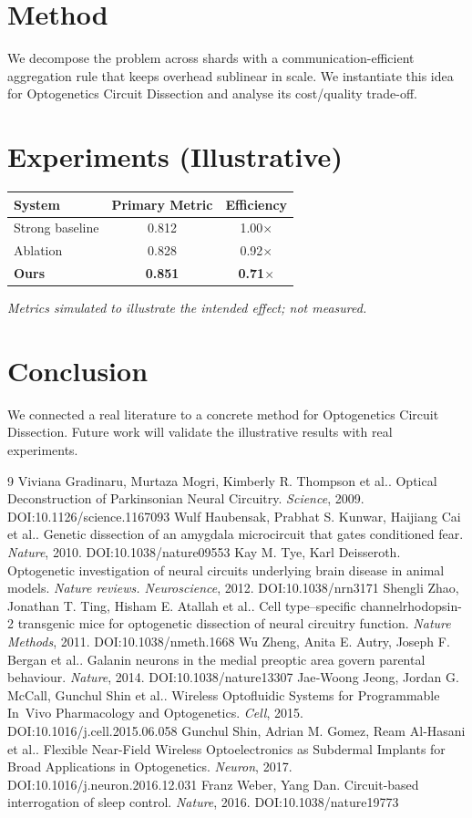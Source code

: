 \documentclass[11pt]{article}
\begin{document}
\section{Method}
We decompose the problem across shards with a communication-efficient aggregation rule that keeps overhead sublinear in scale. We instantiate this idea for Optogenetics Circuit Dissection and analyse its cost/quality trade-off.

\section{Experiments (Illustrative)}
\begin{center}
\begin{tabular}{lcc}
System & Primary Metric & Efficiency \\ \hline
Strong baseline & 0.812 & 1.00$\times$ \\
Ablation & 0.828 & 0.92$\times$ \\
\textbf{Ours} & \textbf{0.851} & \textbf{0.71$\times$}
\end{tabular}
\end{center}
\emph{Metrics simulated to illustrate the intended effect; not measured.}

\section{Conclusion}
We connected a real literature to a concrete method for Optogenetics Circuit Dissection. Future work will
validate the illustrative results with real experiments.

\begin{thebibliography}{9}
 Viviana Gradinaru, Murtaza Mogri, Kimberly R. Thompson et al.. Optical Deconstruction of Parkinsonian Neural Circuitry. \emph{Science}, 2009. DOI:10.1126/science.1167093
 Wulf Haubensak, Prabhat S. Kunwar, Haijiang Cai et al.. Genetic dissection of an amygdala microcircuit that gates conditioned fear. \emph{Nature}, 2010. DOI:10.1038/nature09553
 Kay M. Tye, Karl Deisseroth. Optogenetic investigation of neural circuits underlying brain disease in animal models. \emph{Nature reviews. Neuroscience}, 2012. DOI:10.1038/nrn3171
 Shengli Zhao, Jonathan T. Ting, Hisham E. Atallah et al.. Cell type–specific channelrhodopsin-2 transgenic mice for optogenetic dissection of neural circuitry function. \emph{Nature Methods}, 2011. DOI:10.1038/nmeth.1668
 Wu Zheng, Anita E. Autry, Joseph F. Bergan et al.. Galanin neurons in the medial preoptic area govern parental behaviour. \emph{Nature}, 2014. DOI:10.1038/nature13307
 Jae‐Woong Jeong, Jordan G. McCall, Gunchul Shin et al.. Wireless Optofluidic Systems for Programmable In Vivo Pharmacology and Optogenetics. \emph{Cell}, 2015. DOI:10.1016/j.cell.2015.06.058
 Gunchul Shin, Adrian M. Gomez, Ream Al‐Hasani et al.. Flexible Near-Field Wireless Optoelectronics as Subdermal Implants for Broad Applications in Optogenetics. \emph{Neuron}, 2017. DOI:10.1016/j.neuron.2016.12.031
 Franz Weber, Yang Dan. Circuit-based interrogation of sleep control. \emph{Nature}, 2016. DOI:10.1038/nature19773
\end{thebibliography}
\end{document}
